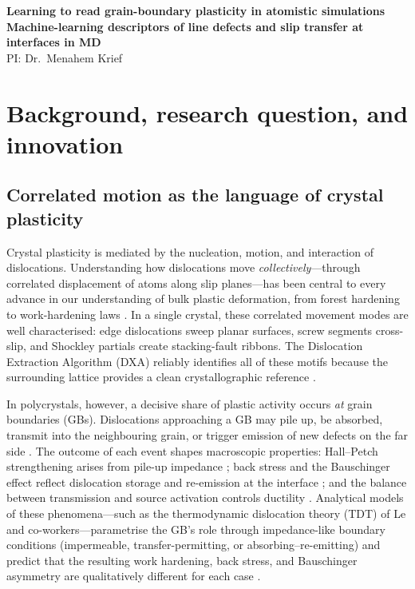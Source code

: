 \documentclass[11pt]{article}
\begin{document}
\begin{center}
{\Large \textbf{Learning to read grain-boundary plasticity in atomistic simulations}}\\
\vspace{0.2em}
{\large \textbf{Machine-learning descriptors of line defects and slip transfer at interfaces in MD}}\\
\vspace{0.4em}
{\normalsize PI: Dr.\ Menahem Krief}\\
\vspace{0.3em}
\end{center}

\section*{Background, research question, and innovation}

\subsection*{Correlated motion as the language of crystal plasticity}
Crystal plasticity is mediated by the nucleation, motion, and interaction of dislocations.
Understanding how dislocations move \emph{collectively}---through correlated displacement of atoms along slip planes---has been central to every advance in our understanding of bulk plastic deformation, from forest hardening to work-hardening laws \cite{Cordero2016}.
In a single crystal, these correlated movement modes are well characterised: edge dislocations sweep planar surfaces, screw segments cross-slip, and Shockley partials create stacking-fault ribbons.
The Dislocation Extraction Algorithm (DXA) reliably identifies all of these motifs because the surrounding lattice provides a clean crystallographic reference \cite{OVITODXA}.

In polycrystals, however, a decisive share of plastic activity occurs \emph{at} grain boundaries (GBs).
Dislocations approaching a GB may pile up, be absorbed, transmit into the neighbouring grain, or trigger emission of new defects on the far side \cite{Piao2022,Liu2020,DGI2025}.
The outcome of each event shapes macroscopic properties: Hall--Petch strengthening arises from pile-up impedance \cite{Cordero2016}; back stress and the Bauschinger effect reflect dislocation storage and re-emission at the interface \cite{Gao2022,LeBauschinger2018,Piao2022}; and the balance between transmission and source activation controls ductility \cite{Liu2020}.
Analytical models of these phenomena---such as the thermodynamic dislocation theory (TDT) of Le and co-workers---parametrise the GB's role through impedance-like boundary conditions (impermeable, transfer-permitting, or absorbing--re-emitting) and predict that the resulting work hardening, back stress, and Bauschinger asymmetry are qualitatively different for each case \cite{Piao2022,LeBauschinger2018}.
\end{document}
